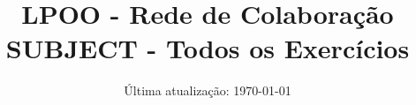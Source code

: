\documentclass[a4paper,12pt]{article}
\title{ LPOO - Rede de Colaboração \\
SUBJECT - Todos os Exercícios }
\author{ }
\date{ Última atualização: \today }
\begin{document}
\maketitle

\ExerciseSelectSUBSET

\ExerciseStopSelect
\end{document}

